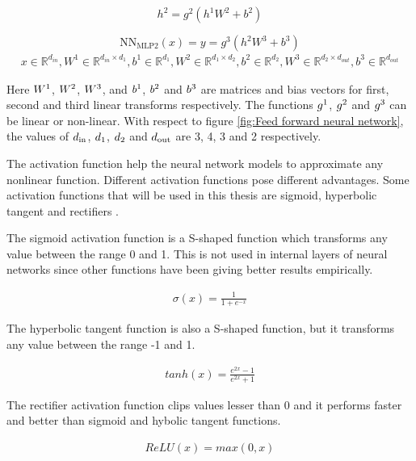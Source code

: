\documentclass[a4paper, 11pt]{article}
\newcommand{\R}{\mathbb{R}}
\begin{document}
\begin{equation}
h^2 = g^2(h^1W^2 + b^2)
\end{equation}

\begin{equation} \label{equ: feed forward output layer}
\mathrm{NN_{MLP2}}(x) = y = g^3(h^2W^3 + b^3)
\end{equation}
\begin{align*}
x \in \R^{d_{in}}, W^1 \in \R^{d_{in} \times d_1}, b^1 \in \R^{d_1}, W^2 \in \R^{d_1 \times d_2}, b^2 \in \R^{d_2}, W^3 \in \R^{d_2 \times d_{out}}, b^3 \in \R^{d_{out}}
\end{align*}

Here $W\textsuperscript{1}$, $W\textsuperscript{2}$, $W\textsuperscript{3}$,  and $b\textsuperscript{1}$, $b\textsuperscript{2}$ and $b\textsuperscript{3}$ are matrices and bias vectors for first, second and third linear transforms respectively. The functions $g\textsuperscript{1}$, $g\textsuperscript{2}$ and $g\textsuperscript{3}$ can be linear or non-linear. With respect to figure \ref{fig:Feed forward neural network}, the values of $d\textsubscript{in}$, $d\textsubscript{1}$, $d\textsubscript{2}$ and $d\textsubscript{out}$ are 3, 4, 3 and 2 respectively. 

The activation function help the neural network models to approximate any nonlinear function. Different activation functions pose different advantages. Some activation functions that will be used in this thesis are sigmoid, hyperbolic tangent and rectifiers \cite{Goldberg2016}.

The sigmoid activation function is a S-shaped function which transforms any value between the range 0 and 1. This is not used in internal layers of neural networks since other functions have been giving better results empirically. 

\begin{align*}
\sigma (x) = \frac{1}{1 + e^{-x}}
\end{align*} 

The hyperbolic tangent function is also a S-shaped function, but it transforms any value between the range -1 and 1.

\begin{align*}
tanh(x) = \frac{e^{2x}-1}{e^{2x}+1}
\end{align*}

The rectifier activation function clips values lesser than 0 and it performs faster and better than sigmoid and hybolic tangent functions.

\begin{align*}
ReLU(x) = max(0,x)
\end{align*}
\end{document}
